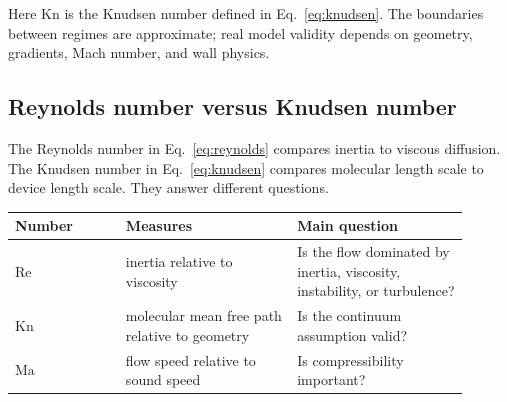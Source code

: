 \documentclass[11pt]{article}
\newcommand{\kn}{\mathrm{Kn}}
\newcommand{\re}{\mathrm{Re}}
\newcommand{\ma}{\mathrm{Ma}}
\begin{document}
Here $\kn$ is the Knudsen number defined in Eq.~\eqref{eq:knudsen}.  The boundaries between regimes are approximate; real model validity depends on geometry, gradients, Mach number, and wall physics.

\begin{center}
\end{center}

\subsection{Reynolds number versus Knudsen number}

The Reynolds number in Eq.~\eqref{eq:reynolds} compares inertia to viscous diffusion.  The Knudsen number in Eq.~\eqref{eq:knudsen} compares molecular length scale to device length scale.  They answer different questions.

\begin{center}
\begin{tabular}{p{0.22\linewidth}p{0.34\linewidth}p{0.34\linewidth}}
\toprule
Number & Measures & Main question \\
\midrule
$\re$ & inertia relative to viscosity & Is the flow dominated by inertia, viscosity, instability, or turbulence? \\
$\kn$ & molecular mean free path relative to geometry & Is the continuum assumption valid? \\
$\ma$ & flow speed relative to sound speed & Is compressibility important? \\
\bottomrule
\end{tabular}
\end{center}
\end{document}
